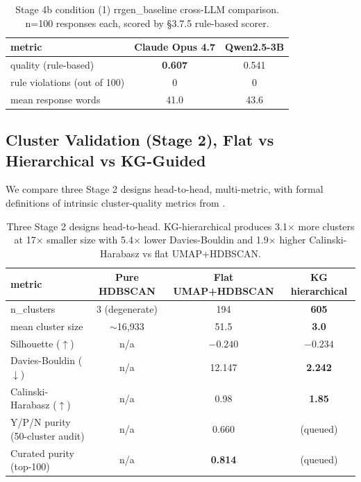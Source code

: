 \documentclass[sigconf, nonacm, anonymous, balance=false]{acmart}
\begin{document}
\begin{table}[t]\centering\footnotesize\setlength{\tabcolsep}{4pt}
\caption{Stage 4b condition (1) rrgen\_baseline cross-LLM comparison. n=100 responses each, scored by §3.7.5 rule-based scorer.}\label{tab:stage4b-crossllm}
\begin{tabular}{lcc}\toprule
metric & Claude Opus 4.7 & Qwen2.5-3B \\\midrule
quality (rule-based) & \textbf{0.607} & 0.541 \\
rule violations (out of 100) & 0 & 0 \\
mean response words & 41.0 & 43.6 \\\bottomrule
\end{tabular}\end{table}


\subsection{Cluster Validation (Stage 2), Flat vs Hierarchical vs KG-Guided}\label{cluster-validation-stage-2-flat-vs-hierarchical-vs-kg-guided}

We compare three Stage 2 designs head-to-head, multi-metric, with formal definitions of intrinsic cluster-quality metrics from \cite{rousseeuw1987silhouettes, davies1979cluster, calinski1974dendrite, manning2008introduction}.

\begin{table}[t]\centering\footnotesize\setlength{\tabcolsep}{4pt}
\caption{Three Stage 2 designs head-to-head. KG-hierarchical produces 3.1$\times$ more clusters at 17$\times$ smaller size with 5.4$\times$ lower Davies-Bouldin and 1.9$\times$ higher Calinski-Harabasz vs flat UMAP+HDBSCAN.}\label{tab:cluster-quality}
\begin{tabular}{lccc}\toprule
metric & Pure HDBSCAN & Flat UMAP+HDBSCAN & \textbf{KG hierarchical} \\\midrule
n\_clusters & 3 (degenerate) & 194 & \textbf{605} \\
mean cluster size & $\sim$16,933 & 51.5 & \textbf{3.0} \\
Silhouette ($\uparrow$) & n/a & $-0.240$ & $-0.234$ \\
Davies-Bouldin ($\downarrow$) & n/a & 12.147 & \textbf{2.242} \\
Calinski-Harabasz ($\uparrow$) & n/a & 0.98 & \textbf{1.85} \\
Y/P/N purity (50-cluster audit) & n/a & 0.660 & (queued) \\
Curated purity (top-100) & n/a & \textbf{0.814} & (queued) \\
\bottomrule\end{tabular}\end{table}
\end{document}
